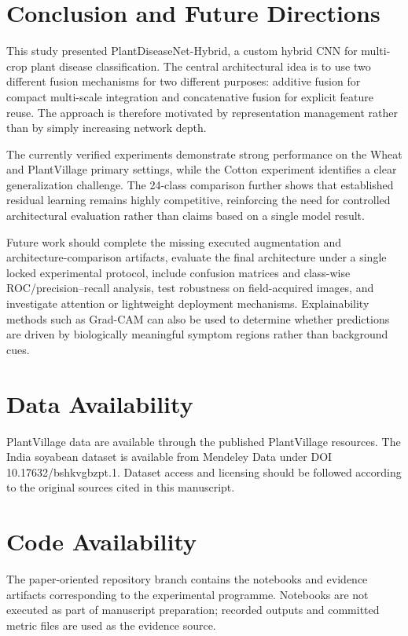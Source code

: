 \documentclass[a4paper,fleqn]{cas-dc}
\begin{document}
\section{Conclusion and Future Directions}
This study presented PlantDiseaseNet-Hybrid, a custom hybrid CNN for multi-crop plant disease classification. The central architectural idea is to use two different fusion mechanisms for two different purposes: additive fusion for compact multi-scale integration and concatenative fusion for explicit feature reuse. The approach is therefore motivated by representation management rather than by simply increasing network depth.

The currently verified experiments demonstrate strong performance on the Wheat and PlantVillage primary settings, while the Cotton experiment identifies a clear generalization challenge. The 24-class comparison further shows that established residual learning remains highly competitive, reinforcing the need for controlled architectural evaluation rather than claims based on a single model result.

Future work should complete the missing executed augmentation and architecture-comparison artifacts, evaluate the final architecture under a single locked experimental protocol, include confusion matrices and class-wise ROC/precision--recall analysis, test robustness on field-acquired images, and investigate attention or lightweight deployment mechanisms. Explainability methods such as Grad-CAM can also be used to determine whether predictions are driven by biologically meaningful symptom regions rather than background cues.

\section*{Data Availability}
PlantVillage data are available through the published PlantVillage resources. The India soyabean dataset is available from Mendeley Data under DOI 10.17632/bshkvgbzpt.1. Dataset access and licensing should be followed according to the original sources cited in this manuscript.

\section*{Code Availability}
The paper-oriented repository branch contains the notebooks and evidence artifacts corresponding to the experimental programme. Notebooks are not executed as part of manuscript preparation; recorded outputs and committed metric files are used as the evidence source.
\end{document}
